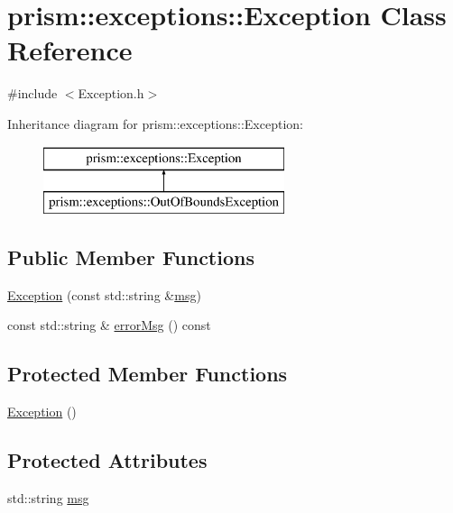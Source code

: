 \hypertarget{classprism_1_1exceptions_1_1_exception}{}\section{prism\+:\+:exceptions\+:\+:Exception Class Reference}
\label{classprism_1_1exceptions_1_1_exception}


{\ttfamily \#include $<$Exception.\+h$>$}

Inheritance diagram for prism\+:\+:exceptions\+:\+:Exception\+:\begin{figure}[H]
\begin{center}
\leavevmode
\includegraphics[height=2.000000cm]{classprism_1_1exceptions_1_1_exception}
\end{center}
\end{figure}
\subsection*{Public Member Functions}
\begin{DoxyCompactItemize}
\item 
\hyperlink{classprism_1_1exceptions_1_1_exception_ad87f4f668b4536a76d0ea13658915102}{Exception} (const std\+::string \&\hyperlink{classprism_1_1exceptions_1_1_exception_a46b99086173d8f609064dc3974703573}{msg})
\item 
const std\+::string \& \hyperlink{classprism_1_1exceptions_1_1_exception_ab0681204c1a8d3327bbddc401c83e006}{error\+Msg} () const 
\end{DoxyCompactItemize}
\subsection*{Protected Member Functions}
\begin{DoxyCompactItemize}
\item 
\hyperlink{classprism_1_1exceptions_1_1_exception_a51db0a29e9fc7b5b9702752753aa7cee}{Exception} ()
\end{DoxyCompactItemize}
\subsection*{Protected Attributes}
\begin{DoxyCompactItemize}
\item 
std\+::string \hyperlink{classprism_1_1exceptions_1_1_exception_a46b99086173d8f609064dc3974703573}{msg}
\end{DoxyCompactItemize}


